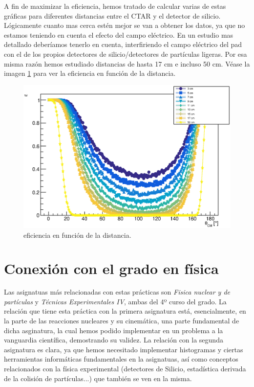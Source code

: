 \documentclass[12pt,a4paper]{article}
\numberwithin{equation}{section}
\numberwithin{figure}{section}
\begin{document}
A fin de maximizar la eficiencia, hemos tratado de calcular varias de estas gráficas para diferentes distancias entre el CTAR y el detector de silicio. Lógicamente cuanto mas cerca estén mejor se van a obtener los datos, ya que no estamos teniendo en cuenta el efecto del campo eléctrico. En un estudio mas detallado deberíamos tenerlo en cuenta, interfiriendo el campo eléctrico del pad con el de los propios detectores de silicio/detectores de partículas ligeras. Por esa misma razón hemos estudiado distancias de hasta 17 cm e incluso 50 cm. Véase la imagen \ref{Fig:2.4-Efficiencia} para ver la eficiencia en función de la distancia. 

\begin{figure}[h!] \centering
    \includegraphics[scale=0.8]{Eff.eps}
    \caption{eficiencia en función de la distancia.}
    \label{Fig:2.4-Efficiencia}
\end{figure}



\section{Conexión con el grado en física}

Las asignatuas más relacionadas con estas prácticas son {\it Fisica nuclear y de partículas} y {\it Técnicas Experimentales IV}, ambas del 4º curso del grado. La relación que tiene esta práctica con la primera asignatura está, esencialmente, en la parte de las reacciones nucleares y su cinemática, una parte fundamental de dicha asginatura, la cual hemos podido implementar en un problema a la vanguardia científica, demostrando su validez. La relación con la segunda asignatura es clara, ya que hemos necesitado implementar histogramas y ciertas herramientas informáticas fundamentales en la asignatuas, así como conceptos relacionados con la física experimental (detectores de Silicio, estadística derivada de la colisión de partículas...) que también se ven en la misma. 
\end{document}
